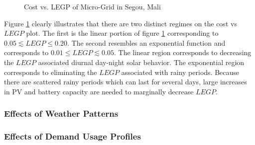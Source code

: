 \documentclass{article}
\begin{document}
\begin{figure}[h]  \label{fig:CostVLEGPMali}
  \centering
  \caption{Cost vs. LEGP of Micro-Grid in Segou, Mali}
\end{figure}

Figure \ref{fig:CostVLEGPMali} clearly illustrates that there are two distinct regimes on the cost vs $LEGP$ plot. 
The first is the linear portion of figure \ref{fig:CostVLEGPMali} corresponding to $ 0.05 \lesssim LEGP \leq 0.20$. 
The second resembles an exponential function and corresponds to $ 0.01 \leq LEGP \lesssim 0.05$. 
The linear region corresponds to decreasing the $LEGP$ associated diurnal day-night solar behavior. 
The exponential region corresponds to eliminating the $LEGP$ associated with rainy periods.
Because there are scattered rainy periods which can last for several days, large increases in PV and battery capacity are needed to marginally decrease $LEGP$.


\subsubsection{Effects of Weather Patterns}

\subsubsection{Effects of Demand Usage Profiles}
\end{document}
